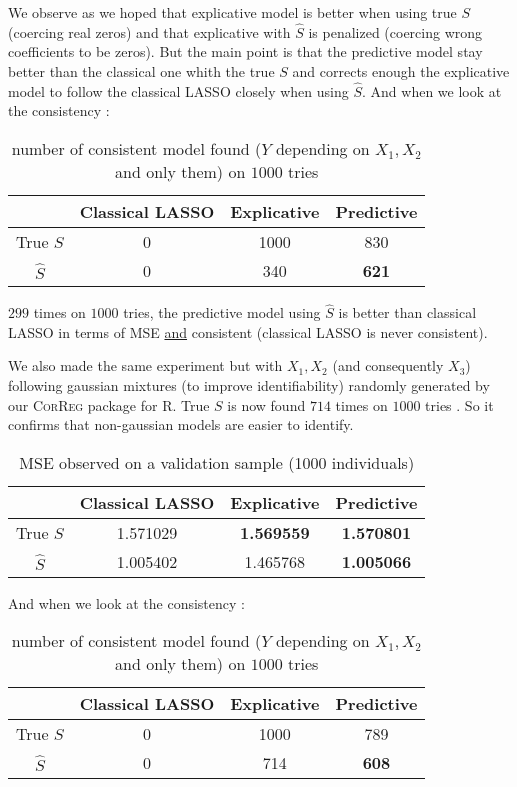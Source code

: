 \documentclass[12pt,a4paper]{report}
\begin{document}
		We observe as we hoped that explicative model is better when using true $S$ (coercing real zeros) and that explicative with $\hat{S}$ is penalized (coercing wrong coefficients to be zeros).
		But the main point is that the predictive model stay better than the classical one whith the true $S$ and corrects enough the explicative model to follow the classical LASSO closely when using $\hat{S}$. 
		And when we look at the consistency :
		\begin{table}[h!]	
		\centering
		\begin{tabular}{|c|c|c|c|}
		\hline 
		 & Classical LASSO & Explicative & Predictive \\ 
		\hline 
		True $S$ &  0 & 1000 & 830 \\ 
		\hline 
		$\hat{S}$ & 0 & 340 & \textbf{621} \\ 
		\hline 
		\end{tabular} 
		\caption{number of consistent model found ($Y$ depending on $X_1,X_2$ and only them) on $1000$ tries}
		\end{table}				
		
		$299$ times on $1000$ tries, the predictive model using $\hat{S}$ is better than classical LASSO in terms of MSE \underline{and} consistent (classical LASSO is never consistent).
		
		We also made the same experiment but with $X_1,X_2$ (and consequently $X_3$) following gaussian mixtures (to improve identifiability) randomly generated by our \textsc{CorReg} package for R. 
		True $S$ is now found $714$ times on $1000$ tries \label{testidentifiable}. So it confirms that non-gaussian models are easier to identify.
		
		
		\begin{table}[h!]
		\centering
		\begin{tabular}{|c|c|c|c|}
		\hline 
		 & Classical LASSO & Explicative & Predictive \\ 
		\hline 
		True $S$ &  1.571029 & \textbf{1.569559} & \textbf{1.570801} \\ 
		\hline 
		$\hat{S}$ & 1.005402 & 1.465768 & \textbf{1.005066} \\ 
		\hline 
		\end{tabular} 
		\caption{MSE observed on a validation sample (1000 individuals)}
		\end{table}

		And when we look at the consistency :
		\begin{table}[h!]
		\centering	
		\begin{tabular}{|c|c|c|c|}
		\hline 
		 & Classical LASSO & Explicative & Predictive \\ 
		\hline 
		True $S$ &  0 & 1000 & 789 \\ 
		\hline 
		$\hat{S}$ & 0 & 714 & \textbf{608} \\ 
		\hline 
		\end{tabular} 
		\caption{number of consistent model found ($Y$ depending on $X_1,X_2$ and only them) on $1000$ tries}
		\end{table}				
				
\end{document}
